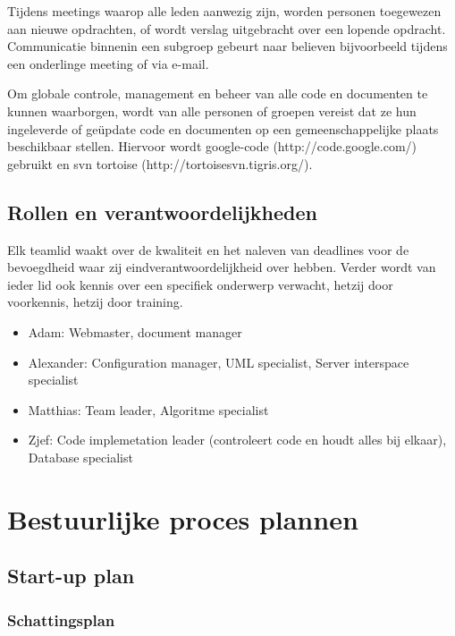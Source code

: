 \documentclass{article}
\begin{document}
Tijdens meetings waarop alle leden aanwezig zijn, worden personen toegewezen aan nieuwe opdrachten, of wordt verslag uitgebracht over een lopende opdracht.
Communicatie binnenin een subgroep gebeurt naar believen bijvoorbeeld tijdens een onderlinge meeting of via e-mail.

Om globale controle, management en beheer van alle code en documenten te kunnen waarborgen, wordt van alle personen of groepen vereist dat ze hun ingeleverde of ge\"{u}pdate code en documenten op een gemeenschappelijke plaats beschikbaar stellen.
Hiervoor wordt google-code (http://code.google.com/) gebruikt en svn tortoise (http://tortoisesvn.tigris.org/).

\subsection{Rollen en verantwoordelijkheden}

Elk teamlid waakt over de kwaliteit en het naleven van deadlines voor de bevoegdheid waar zij eindverantwoordelijkheid over hebben.
Verder wordt van ieder lid ook kennis over een specifiek onderwerp verwacht, hetzij door voorkennis, hetzij door training.

\begin{itemize}
\item[] Adam: Webmaster, document manager \\[-5mm]
\item[] Alexander: Configuration manager, UML specialist, Server interspace specialist \\[-5mm]
\item[] Matthias: Team leader, Algoritme specialist \\[-5mm]
\item[] Zjef: Code implemetation leader (controleert code en houdt alles bij elkaar), Database specialist \\[-5mm]
\end{itemize}
 
\newpage
\section{Bestuurlijke proces plannen}


\subsection{Start-up plan}

\subsubsection{Schattingsplan}
\end{document}
